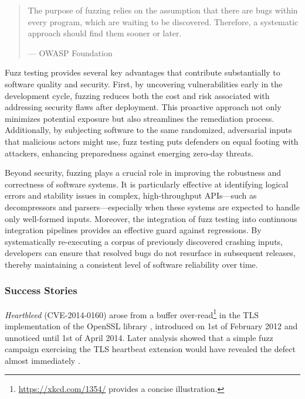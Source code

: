 \documentclass[
  a4paper,
]{scrreprt}
\theoremstyle{definition}
\theoremstyle{remark}
\begin{document}
\begin{quote}
The purpose of fuzzing relies on the assumption that there are bugs
within every program, which are waiting to be discovered. Therefore, a
systematic approach should find them sooner or later.

--- OWASP Foundation \autocite{owaspfoundation}
\end{quote}

Fuzz testing provides several key advantages that contribute
substantially to software quality and security. First, by uncovering
vulnerabilities early in the development cycle, fuzzing reduces both the
cost and risk associated with addressing security flaws after
deployment. This proactive approach not only minimizes potential
exposure but also streamlines the remediation process. Additionally, by
subjecting software to the same randomized, adversarial inputs that
malicious actors might use, fuzz testing puts defenders on equal footing
with attackers, enhancing preparedness against emerging zero-day
threats.

Beyond security, fuzzing plays a crucial role in improving the
robustness and correctness of software systems. It is particularly
effective at identifying logical errors and stability issues in complex,
high-throughput APIs---such as decompressors and parsers---especially
when these systems are expected to handle only well-formed inputs.
Moreover, the integration of fuzz testing into continuous integration
pipelines provides an effective guard against regressions. By
systematically re-executing a corpus of previously discovered crashing
inputs, developers can ensure that resolved bugs do not resurface in
subsequent releases, thereby maintaining a consistent level of software
reliability over time.

\subsubsection{Success Stories}\label{success-stories}

\emph{Heartbleed} (CVE-2014-0160) \autocite{heartbleed,heartbleed-cve}
arose from a buffer over-read\footnote{\url{https://xkcd.com/1354/}
  provides a concise illustration.} in the TLS implementation of the
OpenSSL library \autocite{theopensslproject2025}, introduced on 1st of
February 2012 and unnoticed until 1st of April 2014. Later analysis
showed that a simple fuzz campaign exercising the TLS heartbeat
extension would have revealed the defect almost immediately
\autocite{wheeler2014}.
\end{document}

